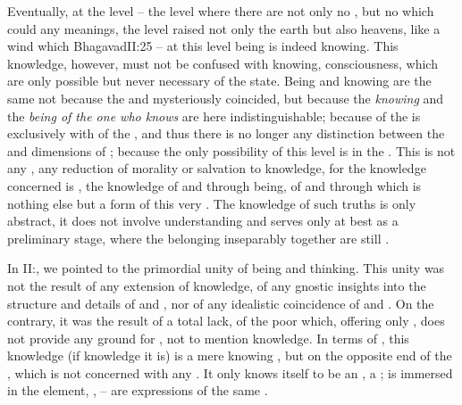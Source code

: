 Eventually, at the  level -- the level where there are not only no
, but no  which could  any
 meanings, the level raised not only  the earth but also
 heavens, like a wind which   \citet{invisible [...] to mortal eyes, beyond
  thought and beyond change}{Bhagavad}{II:25} -- at this level being is indeed
knowing.  This knowledge, however, must not be confused with 
knowing,  consciousness, which are only possible but never
necessary  of the  state. Being and knowing are
the same not because the  and  mysteriously
coincided, but because the {\em knowing} and the {\em being of the one who
  knows} are here indistinguishable; because  of the 
is  exclusively with  of the , and
thus there is no longer any distinction between the  and
 dimensions of ; because the only possibility of
this level is  in the .   This is not any
, any reduction of morality or salvation to knowledge, for
the knowledge concerned is , the knowledge of and through being, of
and through  which is nothing else but a  form of
this very . The  knowledge of such truths is only
abstract, it does not involve understanding and serves only at best as a
preliminary stage, where the  belonging inseparably together are
still .

In II:, we pointed to the
  primordial  unity of being and thinking. This unity was not the
  result of any extension of  knowledge, of any gnostic insights into
  the structure and details of  and , nor of any
  idealistic coincidence of  and . On the contrary, it
  was the result of a total lack, of the poor  which, offering
  only , does not provide any ground for , not to
  mention  knowledge.  In terms of , this knowledge (if
  knowledge it is) is a mere knowing , but  on the opposite end
  of the  ,  which is not
  concerned with any . It only knows itself to be an , a
  ;  is immersed in the 
  element, ,  -- are
expressions of the same .

